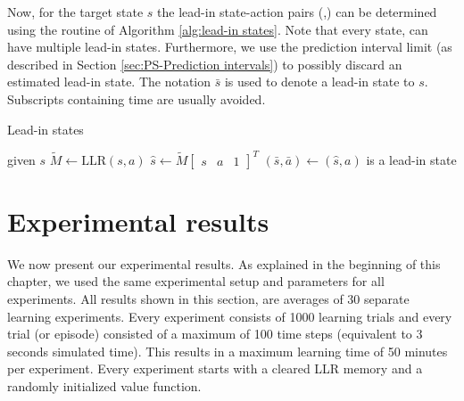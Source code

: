 Now, for the target state $s$ the lead-in state-action pairs (,) can be determined using the routine of Algorithm \ref{alg:lead-in states}. Note that every state, can have multiple lead-in states. Furthermore, we use the prediction interval limit (as described in Section \ref{sec:PS-Prediction intervals}) to possibly discard an estimated lead-in state. The notation $\bar{s}$ is used to denote a lead-in state to $s$. Subscripts containing time are usually avoided. 
\begin{algorithm}[ht]
	\caption{Lead-in states} \label{alg:lead-in states}
	\begin{algorithmic}[1]
		\State given $s$ 																
			\State $\tilde{M} \gets \textrm{LLR}(s,a)$ 		
			\State $\hat{s} \gets \tilde{M}\left[\begin{array}{ccc} s & a & 1 \end{array}\right]^T$
			 					
				\State $(\bar{s},\bar{a})\gets(\hat{s},a)$ is a lead-in state	
			\EndIf		
		\EndFor
	\end{algorithmic}
\end{algorithm}








\section{Experimental results}\label{sec:PS-results}
We now present our experimental results. As explained in the beginning of this chapter, we used the same experimental setup and parameters for all experiments. All results shown in this section, are averages of 30 separate learning experiments. Every experiment consists of 1000 learning trials and every trial (or episode) consisted of a maximum of 100 time steps (equivalent to 3 seconds simulated time). This results in a maximum learning time of 50 minutes per experiment. Every experiment starts with a cleared \ac{LLR} memory and a randomly initialized value function.



